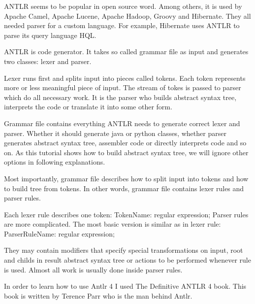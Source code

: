 ANTLR seems to be popular in open source word. Among others, it is used by Apache Camel, Apache Lucene, Apache Hadoop, Groovy and Hibernate. They all needed parser for a custom language. For example, Hibernate uses ANTLR to parse its query language HQL.

ANTLR is code generator. It takes so called grammar file as input and generates two classes: lexer and parser.

Lexer runs first and splits input into pieces called tokens. Each token represents more or less meaningful piece of input. The stream of tokes is passed to parser which do all necessary work. It is the parser who builds abstract syntax tree, interprets the code or translate it into some other form.

Grammar file contains everything ANTLR needs to generate correct lexer and parser. Whether it should generate java or python classes, whether parser generates abstract syntax tree, assembler code or directly interprets code and so on. As this tutorial shows how to build abstract syntax tree, we will ignore other options in following explanations.

Most importantly, grammar file describes how to split input into tokens and how to build tree from tokens. In other words, grammar file contains lexer rules and parser rules.

Each lexer rule describes one token: TokenName: regular expression; Parser rules are more complicated. The most basic version is similar as in lexer rule: ParserRuleName: regular expression;  

They may contain modifiers that specify special transformations on input, root and childs in result abstract syntax tree or actions to be performed whenever rule is used. Almost all work is usually done inside parser rules.

In order to learn how to use Antlr 4 I used The Definitive ANTLR 4 \cite{Terence2012} book. This book is written by Terence Parr who is the man behind Antlr.
